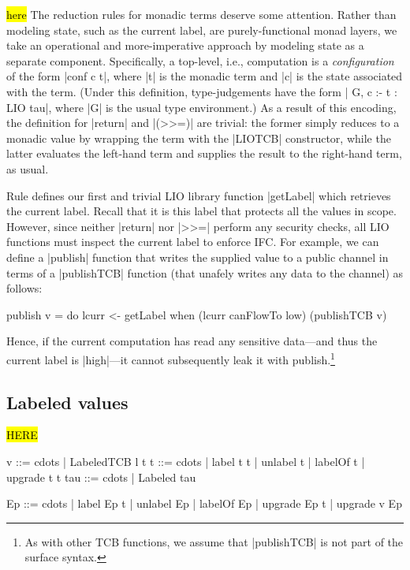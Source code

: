 \hl{here}
The reduction rules for monadic terms deserve some attention.
%
Rather than modeling state, such as the current label, are
purely-functional monad layers, we take an operational and
more-imperative approach by modeling state as a separate component.
%
Specifically, a top-level, i.e., computation is a \emph{configuration}
of the form |conf c t|, where |t| is the monadic term and |c| is the
state associated with the term.
%
(Under this definition, \lio{} type-judgements have the form | G, c :-
t : LIO tau|, where |G| is the usual type environment.)
%
As a result of this encoding, the definition for |return| and |(>>=)|
are trivial: the former simply reduces to a monadic value by wrapping
the term with the |LIOTCB| constructor, while the latter evaluates the
left-hand term and supplies the result to the right-hand term, as
usual.
 
Rule  defines our first and trivial LIO library
function |getLabel| which retrieves the current label.
%
Recall that it is this label that protects all the values in scope.
%
However, since neither |return| nor |>>=| perform any security checks,
all LIO functions must inspect the current label to enforce IFC.
%
For example, we can define a |publish| function that writes the
supplied value to a public channel in terms of a |publishTCB| function
(that unafely writes any data to the channel) as follows:
\begin{code}
publish v = do  lcurr <- getLabel 
                when (lcurr canFlowTo low) (publishTCB v)
\end{code}
Hence, if the current computation has read any sensitive data---and
thus the current label is |high|---it cannot subsequently leak it with
publish.\footnote{
  As with other TCB functions, we assume that |publishTCB| is not part
  of the surface syntax.
}

\subsection{Labeled values}
\hl{HERE}

\begin{code}
v    ::= cdots  | LabeledTCB l t
t    ::= cdots  | label t t | unlabel t | labelOf t
                | upgrade t t
tau  ::= cdots  | Labeled tau

Ep   ::= cdots  | label Ep t | unlabel Ep | labelOf Ep
                | upgrade Ep t | upgrade v Ep
\end{code}

